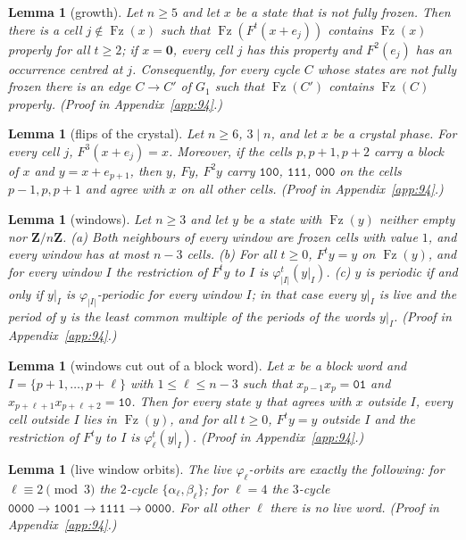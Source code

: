 \documentclass[10pt,a4paper]{article}
\newtheorem{lemma}[theorem]{Lemma}
\newcommand{\Zn}{\mathbf{Z}/n\mathbf{Z}}      %
\newcommand{\zero}{\mathbf{0}}                %
\newcommand{\Gone}{G_1}                       %
\newcommand{\code}[1]{\mathtt{#1}}            %
\newcommand{\Fz}{\operatorname{Fz}}           %
\begin{document}
\begin{lemma}[growth]\label{94:lem:growth}
Let $n\ge5$ and let $x$ be a state that is not fully frozen. Then there is a cell $j\notin\Fz(x)$ such that
$\Fz(F^t(x+e_j))$ contains $\Fz(x)$ properly for all $t\ge2$; if $x=\zero$, every cell $j$ has this property and
$F^2(e_j)$ has an occurrence centred at $j$. Consequently, for every cycle $C$ whose states are not fully frozen
there is an edge $C\to C'$ of $\Gone$ such that $\Fz(C')$ contains $\Fz(C)$ properly.
(Proof in Appendix~\ref{app:94}.)
\end{lemma}

\begin{lemma}[flips of the crystal]\label{94:lem:crystal}
Let $n\ge6$, $3\mid n$, and let $x$ be a crystal phase. For every cell $j$, $F^3(x+e_j)=x$. Moreover, if the
cells $p,p+1,p+2$ carry a block of $x$ and $y=x+e_{p+1}$, then $y$, $Fy$, $F^2y$ carry $\code{100}$, $\code{111}$,
$\code{000}$ on the cells $p-1,p,p+1$ and agree with $x$ on all other cells. (Proof in Appendix~\ref{app:94}.)
\end{lemma}

\begin{lemma}[windows]\label{94:lem:windows}
Let $n\ge3$ and let $y$ be a state with $\Fz(y)$ neither empty nor $\Zn$.
\textup{(a)} Both neighbours of every window are frozen cells with value $1$, and every window has at most $n-3$
cells.
\textup{(b)} For all $t\ge0$, $F^ty=y$ on $\Fz(y)$, and for every window $I$ the restriction of $F^ty$ to $I$ is
$\varphi_{|I|}^t(y|_I)$.
\textup{(c)} $y$ is periodic if and only if $y|_I$ is $\varphi_{|I|}$-periodic for every window $I$; in that case
every $y|_I$ is live and the period of $y$ is the least common multiple of the periods of the words $y|_I$.
(Proof in Appendix~\ref{app:94}.)
\end{lemma}

\begin{lemma}[windows cut out of a block word]\label{94:lem:cut}
Let $x$ be a block word and $I=\{p+1,\dots,p+\ell\}$ with $1\le\ell\le n-3$ such that $x_{p-1}x_p=\code{01}$ and
$x_{p+\ell+1}x_{p+\ell+2}=\code{10}$. Then for every state $y$ that agrees with $x$ outside $I$, every cell
outside $I$ lies in $\Fz(y)$, and for all $t\ge0$, $F^ty=y$ outside $I$ and the restriction of $F^ty$ to $I$ is
$\varphi_\ell^t(y|_I)$. (Proof in Appendix~\ref{app:94}.)
\end{lemma}

\begin{lemma}[live window orbits]\label{94:lem:live}
The live $\varphi_\ell$-orbits are exactly the following: for $\ell\equiv2\pmod3$ the $2$-cycle
$\{\alpha_\ell,\beta_\ell\}$; for $\ell=4$ the $3$-cycle
$\code{0000}\to\code{1001}\to\code{1111}\to\code{0000}$. For all other $\ell$ there is no live word.
(Proof in Appendix~\ref{app:94}.)
\end{lemma}
\end{document}
